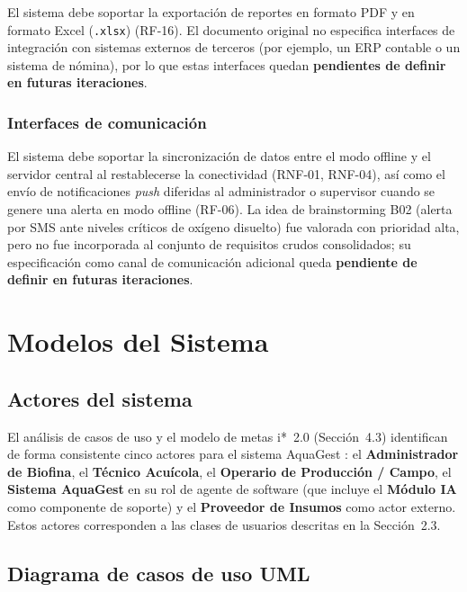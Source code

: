 \documentclass[12pt,a4paper]{article}
\begin{document}
El sistema debe soportar la exportación de reportes en formato PDF y en
formato Excel (\texttt{.xlsx}) (RF-16). El documento original no especifica
interfaces de integración con sistemas externos de terceros (por ejemplo, un
ERP contable o un sistema de nómina), por lo que estas interfaces quedan
\textbf{pendientes de definir en futuras iteraciones}.

\subsubsection{Interfaces de comunicación}

El sistema debe soportar la sincronización de datos entre el modo offline y el
servidor central al restablecerse la conectividad (RNF-01, RNF-04), así como el
envío de notificaciones \textit{push} diferidas al administrador o supervisor
cuando se genere una alerta en modo offline (RF-06). La idea de brainstorming
B02 (alerta por SMS ante niveles críticos de oxígeno disuelto) fue valorada con
prioridad alta, pero no fue incorporada al conjunto de requisitos crudos
consolidados; su especificación como canal de comunicación adicional queda
\textbf{pendiente de definir en futuras iteraciones}.


\section{Modelos del Sistema}

\subsection{Actores del sistema}

El análisis de casos de uso y el modelo de metas i*~2.0 (Sección~4.3)
identifican de forma consistente cinco actores para el sistema AquaGest
\cite{Yu1995,Kavakli2002}: el \textbf{Administrador de Biofina}, el
\textbf{Técnico Acuícola}, el \textbf{Operario de Producción / Campo}, el
\textbf{Sistema AquaGest} en su rol de agente de software (que incluye el
\textbf{Módulo IA} como componente de soporte) y el \textbf{Proveedor de
Insumos} como actor externo. Estos actores corresponden a las clases de
usuarios descritas en la Sección~2.3.

\subsection{Diagrama de casos de uso UML}
\end{document}
